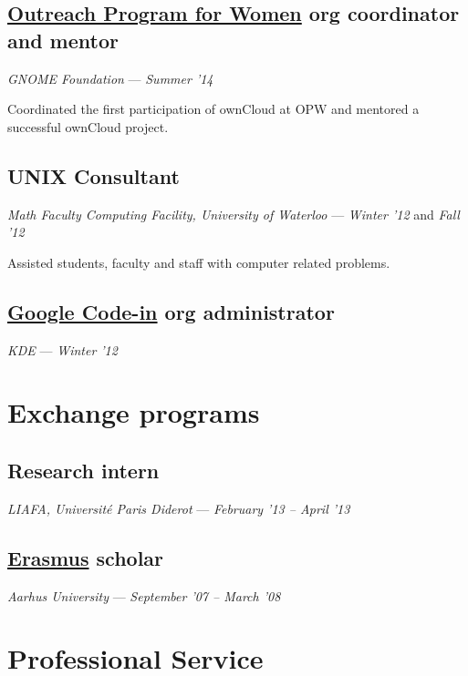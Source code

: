 \documentclass[]{article}
\begin{document}
\subsection{\href{https://gnome.org/opw/}{Outreach Program for Women}
org coordinator and
mentor}\label{outreach-program-for-womenopw-org-coordinator-and-mentor}

\emph{GNOME Foundation} --- \emph{Summer '14}

Coordinated the first participation of ownCloud at OPW and mentored a
successful ownCloud project.

\subsection{UNIX Consultant}\label{unix-consultant}

\emph{Math Faculty Computing Facility, University of Waterloo} ---
\emph{Winter '12} and \emph{Fall '12}

Assisted students, faculty and staff with computer related problems.

\subsection{\href{https://www.google-melange.com/gci/homepage/google/gci2012}{Google
Code-in} org
administrator}\label{google-code-incodein-org-administrator}

\emph{KDE} --- \emph{Winter '12}

\section{Exchange programs}\label{exchange-programs}

\subsection{Research intern}\label{research-intern}

\emph{LIAFA, Université Paris Diderot} --- \emph{February '13 -- April
'13}

\subsection{\href{http://en.wikipedia.org/wiki/Erasmus_Programme}{Erasmus}
scholar}\label{erasmus-scholar}

\emph{Aarhus University} --- \emph{September '07 -- March '08}

\section{Professional Service}\label{professional-service}
\end{document}
